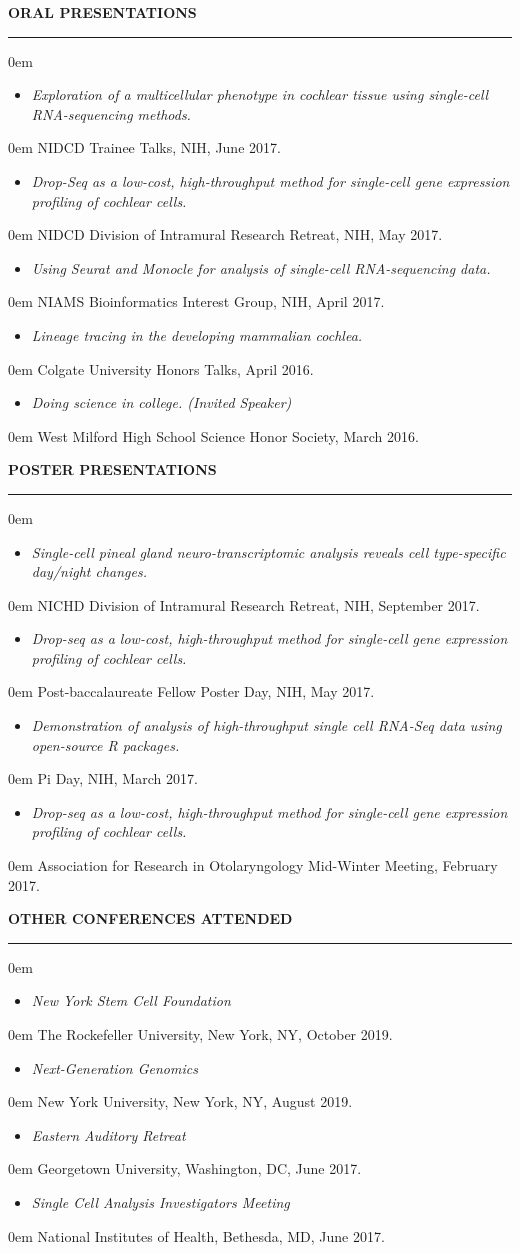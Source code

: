\documentclass[11pt, letterpaper]{article}
\newenvironment{CVSection}{
\begin{addmargin}[2em]{0em}
\begin{samepage}}
{\end{samepage}
\end{addmargin}\bigskip}
\newcommand{\CVList}[2]{
\begin{samepage}
\begin{itemize}[leftmargin=*]
\item \textsl{#1}
\end{itemize}
\begin{addmargin}[2.5em]{0em}
#2
\end{addmargin}
\end{samepage}
}
\newcommand{\CVHeading}[1]{
\MakeUppercase{\bf #1}
\smallskip
\hrule
\medskip
}
\begin{document}
\CVHeading{Oral Presentations}
\begin{CVSection}
\CVList{Exploration of a multicellular phenotype in cochlear tissue using single-cell RNA-sequencing methods.}{NIDCD Trainee Talks, NIH, June 2017.}
\CVList{Drop-Seq as a low-cost, high-throughput method for single-cell gene expression profiling of cochlear cells.}{NIDCD Division of Intramural Research Retreat, NIH, May 2017.}
\CVList{Using Seurat and Monocle for analysis of single-cell RNA-sequencing data.}{NIAMS Bioinformatics Interest Group, NIH, April 2017.}
\CVList{Lineage tracing in the developing mammalian cochlea.}{Colgate University Honors Talks, April 2016.}
\CVList{Doing science in college. \textnormal{(Invited Speaker)}}{West Milford High School Science Honor Society, March 2016.}
\end{CVSection}

\CVHeading{Poster Presentations}
\begin{CVSection}
\CVList{Single-cell pineal gland neuro-transcriptomic analysis reveals cell type-specific day/night changes.}{NICHD Division of Intramural Research Retreat, NIH, September 2017.}
\CVList{Drop-seq as a low-cost, high-throughput method for single-cell gene expression profiling of cochlear cells.}{Post-baccalaureate Fellow Poster Day, NIH, May 2017.}
\CVList{Demonstration of analysis of high-throughput single cell RNA-Seq data using open-source R packages.}{Pi Day, NIH, March 2017.}
\CVList{Drop-seq as a low-cost, high-throughput method for single-cell gene expression profiling of cochlear cells.}{Association for Research in Otolaryngology Mid-Winter Meeting, February 2017.}
\end{CVSection}

\CVHeading{Other Conferences Attended}
\begin{CVSection}
\CVList{New York Stem Cell Foundation}{The Rockefeller University, New York, NY, October 2019.}
\CVList{Next-Generation Genomics}{New York University, New York, NY, August 2019.}
\CVList{Eastern Auditory Retreat}{Georgetown University, Washington, DC, June 2017.}
\CVList{Single Cell Analysis Investigators Meeting}{National Institutes of Health, Bethesda, MD, June 2017.}
\end{CVSection}
\end{document}

